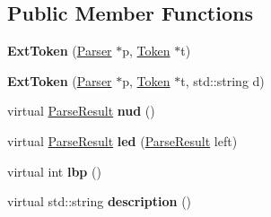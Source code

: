 \subsection*{Public Member Functions}
\begin{DoxyCompactItemize}
\item 
\hypertarget{classExtToken_a45a27528f391faf5679b7b30563ce846}{{\bfseries Ext\-Token} (\hyperlink{classParser}{Parser} $\ast$p, \hyperlink{classToken}{Token} $\ast$t)}\label{classExtToken_a45a27528f391faf5679b7b30563ce846}

\item 
\hypertarget{classExtToken_afa8972152abec42cd52b6f6f70a9a179}{{\bfseries Ext\-Token} (\hyperlink{classParser}{Parser} $\ast$p, \hyperlink{classToken}{Token} $\ast$t, std\-::string d)}\label{classExtToken_afa8972152abec42cd52b6f6f70a9a179}

\item 
\hypertarget{classExtToken_a5c21a5ffe91f212085259126652ab77c}{virtual \hyperlink{classParseResult}{Parse\-Result} {\bfseries nud} ()}\label{classExtToken_a5c21a5ffe91f212085259126652ab77c}

\item 
\hypertarget{classExtToken_afb2c9b0040e198d1d8aa2e041c5a7211}{virtual \hyperlink{classParseResult}{Parse\-Result} {\bfseries led} (\hyperlink{classParseResult}{Parse\-Result} left)}\label{classExtToken_afb2c9b0040e198d1d8aa2e041c5a7211}

\item 
\hypertarget{classExtToken_a6c0d61faa058b71147dd54bacee1db94}{virtual int {\bfseries lbp} ()}\label{classExtToken_a6c0d61faa058b71147dd54bacee1db94}

\item 
\hypertarget{classExtToken_a4ab6e72ac23235650b1756f794172ebb}{virtual std\-::string {\bfseries description} ()}\label{classExtToken_a4ab6e72ac23235650b1756f794172ebb}

\end{DoxyCompactItemize}
